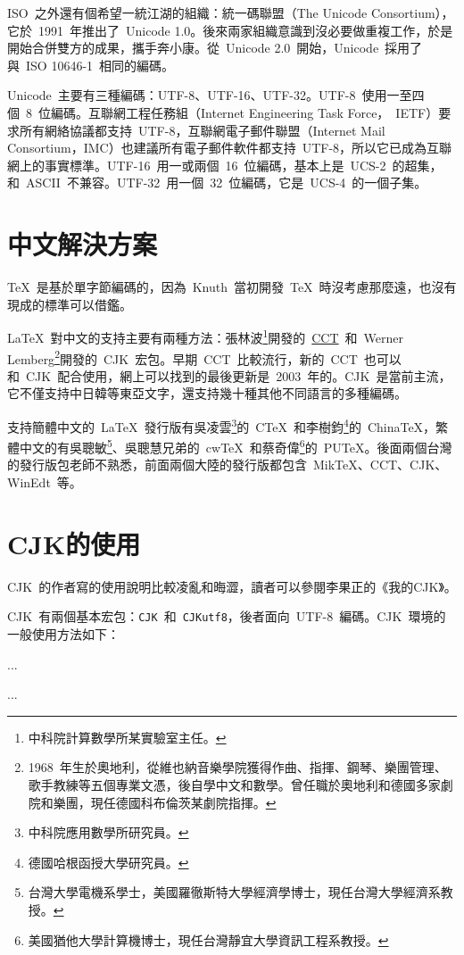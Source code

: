 ISO~之外還有個希望一統江湖的組織：統一碼聯盟（The Unicode Consortium），它於~1991~年推出了~Unicode 1.0。後來兩家組織意識到沒必要做重複工作，於是開始合併雙方的成果，攜手奔小康。從~Unicode 2.0~開始，Unicode~採用了與~ISO 10646-1~相同的編碼。

Unicode~主要有三種編碼：UTF-8、UTF-16、UTF-32。UTF-8~使用一至四個~8~位編碼。互聯網工程任務組（Internet Engineering Task Force，~IETF）要求所有網絡協議都支持~UTF-8，互聯網電子郵件聯盟（Internet Mail Consortium，IMC）也建議所有電子郵件軟件都支持~UTF-8，所以它已成為互聯網上的事實標準。UTF-16~用一或兩個~16~位編碼，基本上是~UCS-2~的超集，和~ASCII~不兼容。UTF-32~用一個~32~位編碼，它是~UCS-4~的一個子集。

\section{中文解決方案}
\TeX~是基於單字節編碼的，因為~Knuth~當初開發~\TeX~時沒考慮那麼遠，也沒有現成的標準可以借鑑。

\LaTeX~對中文的支持主要有兩種方法：張林波\footnote{中科院計算數學所某實驗室主任。}開發的~\href{ftp://ftp.cc.ac.cn/pub/cct/}{CCT}~和~Werner Lemberg\footnote{1968~年生於奧地利，從維也納音樂學院獲得作曲、指揮、鋼琴、樂團管理、歌手教練等五個專業文憑，後自學中文和數學。曾任職於奧地利和德國多家劇院和樂團，現任德國科布倫茨某劇院指揮。}開發的~CJK~宏包。早期~CCT~比較流行，新的~CCT~也可以和~CJK~配合使用，網上可以找到的最後更新是~2003~年的。CJK~是當前主流，它不僅支持中日韓等東亞文字，還支持幾十種其他不同語言的多種編碼。

支持簡體中文的~\LaTeX~發行版有吳凌雲\footnote{中科院應用數學所研究員。}的~CTeX~和李樹鈞\footnote{德國哈根函授大學研究員。}的~ChinaTeX，繁體中文的有吳聰敏\footnote{台灣大學電機系學士，美國羅徹斯特大學經濟學博士，現任台灣大學經濟系教授。}、吳聰慧兄弟的~cwTeX~和蔡奇偉\footnote{美國猶他大學計算機博士，現任台灣靜宜大學資訊工程系教授。}的~PUTeX。後面兩個台灣的發行版包老師不熟悉，前面兩個大陸的發行版都包含~MikTeX、CCT、CJK、WinEdt~等。

\section{CJK的使用}
CJK~的作者寫的使用說明比較凌亂和晦澀，讀者可以參閱李果正的《我的CJK》\citep{Lee_2004a}。

CJK~有兩個基本宏包：\verb|CJK|~和~\verb|CJKutf8|，後者面向~UTF-8~編碼。CJK~環境的一般使用方法如下：

\begin{code}
\usepackage{CJK(utf8)}
...

\begin{CJK}{<encoding>}{<family>}
...
\end{CJK}

\end{code}

